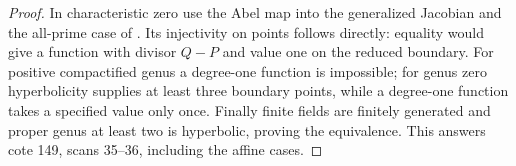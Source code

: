 \begin{proof}
In characteristic zero use the Abel map into the generalized
Jacobian and the all-prime case of . Its
injectivity on points follows directly: equality would give a
function with divisor $Q-P$ and value one on the reduced boundary.
For positive compactified genus a degree-one function is impossible;
for genus zero hyperbolicity supplies at least three boundary points,
while a degree-one function takes a specified value only once.
Finally finite fields are finitely generated and proper genus at
least two is hyperbolic, proving the equivalence. This answers
cote 149, scans 35--36, including the affine cases.
\end{proof}

